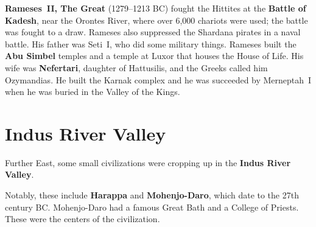 \textbf{Rameses~II, The Great} (1279--1213 BC) fought the Hittites at the \textbf{Battle of Kadesh},
near the Orontes River, where over 6,000 chariots were used;
the battle was fought to a draw.
Rameses also suppressed the Shardana pirates in a naval battle.
His father was Seti~I, who did some military things.
Rameses built the \textbf{Abu Simbel} temples and a temple at Luxor that houses the House of Life.
His wife was \textbf{Nefertari}, daughter of Hattusilis, and the Greeks called him Ozymandias.
He built the Karnak complex and he was succeeded by Merneptah~I when he was buried in the Valley of the Kings.

\section{Indus River Valley}

Further East, some small civilizations were cropping up in the \textbf{Indus River Valley}.

Notably, these include \textbf{Harappa} and \textbf{Mohenjo-Daro}, which date to the 27th century BC\@.
Mohenjo-Daro had a famous Great Bath and a College of Priests.
These were the centers of the civilization.
